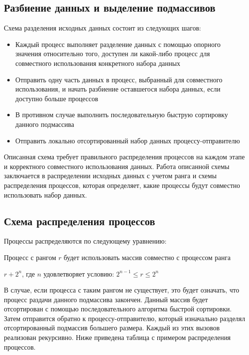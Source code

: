 \documentclass{report}
\begin{document}
\subsection*{Разбиение данных и выделение подмассивов}
Схема разделения исходных данных состоит из следующих шагов:
\begin{itemize}
    \item Каждый процесс выполняет разделение данных с помощью опорного значения относительно того, доступен ли какой-либо процесс для совместного использования конкретного набора данных
    \item Отправить одну часть данных в процесс, выбранный для совместного использования, и начать разбиение оставшегося набора данных, если доступно больше процессов
    \item В противном случае выполнить последовательную быструю сортировку данного подмассива
    \item Отправить локально отсортированный набор данных процессу-отправителю
\end{itemize}
\par Описанная схема требует правильного распределения процессов на каждом этапе и корректного совместного использования данных. Работа описанной схемы заключается в распределении исходных данных с учетом ранга и схемы распределения процессов, которая определяет, какие процессы будут совместно использовать набор данных.
\subsection*{Схема распределения процессов}
Процессы распределяются по следующему уравнению: \par
Процесс с рангом $r$ будет использовать массив совместно с процессом ранга 
\begin{center}
    $r + 2^n$, где $n$ удовлетворяет условию: $2^{n-1} \leq r \leq 2^n$
\end{center}
\par В случае, если процесса с таким рангом не существует, это будет означать, что процесс раздачи данного подмассива закончен. Данный массив будет отсортирован с помощью последовательного алгоритма быстрой сортировки. Затем отправится обратно к процессу-отправителю, который изначально разделял отсортированный подмассив большего размера. Каждый из этих вызовов реализован рекурсивно. Ниже приведена таблица с примером распределения процессов.
\end{document}
